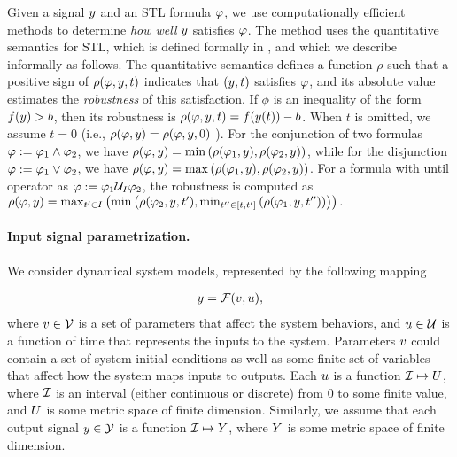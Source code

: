 Given a signal $y$ and an STL formula $\varphi$, we use computationally efficient methods to determine \emph{how well} $y$ satisfies $\varphi$.
The method uses the quantitative semantics for STL, which 
is defined formally in \cite{DonzeM10}, and which we describe informally as follows. The
quantitative semantics defines a function $\rho$ such that a positive sign of
$\rho(\varphi,y,t)$ indicates that $(y,t)$ satisfies
$\varphi$, and its absolute value estimates the \emph{robustness} of
this satisfaction. If $\phi$ is an inequality of the form
$f(y)>b$, then its robustness is $\rho(\varphi,y,t) = f(y(t))-b$.  
When $t$ is omitted, we assume $t=0$ (i.e., $\rho(\varphi,y)=\rho(\varphi,y,0)$ ).
For the conjunction of two
formulas $\varphi := \varphi_1 \wedge \varphi_2$, we have
$\rho(\varphi,y)=\min \left( \rho(\varphi_1,y),\rho(\varphi_2,y)\right)$,
while for the disjunction $\varphi := \varphi_1 \vee \varphi_2$, we have
$\rho(\varphi,y)=\max\left(\rho(\varphi_1,y),\rho(\varphi_2,y)\right)$.
For a formula with until operator as $\varphi := \varphi_1 \mathcal{U}_I \varphi_2$,
the robustness is computed as $\rho(\varphi,y) = \max_{t^\prime\in
  I}\left(\min\left(\rho(\varphi_2,y,t^\prime),\min_{t^{\prime\prime}\in
  [t,t^\prime]}\left(\rho(\varphi_1,y,t^{\prime\prime})\right)\right)\right).$


\paragraph{Input signal parametrization.} We consider dynamical system models, represented by the following mapping

\begin{eqnarray}
y = \mathcal{F} (v, u),
\end{eqnarray}
where $v \in \mathcal{V}$ is a set of parameters that affect the system behaviors, and $u \in \mathcal{U}$ is a function of time that represents the inputs to the system.
Parameters $v$ could contain a set of system initial conditions as well as some finite set of variables that affect how the system maps inputs to outputs.
Each $u$ is a function $\mathcal{I} \mapsto U$, where $\mathcal{I}$ is an interval (either continuous or discrete) from $0$ to some finite value, and $U$ is some metric space of finite dimension.
Similarly, we assume that each output signal $y \in \mathcal{Y}$ is a function $\mathcal{I} \mapsto Y$, where $Y$ is some metric space of finite dimension.

